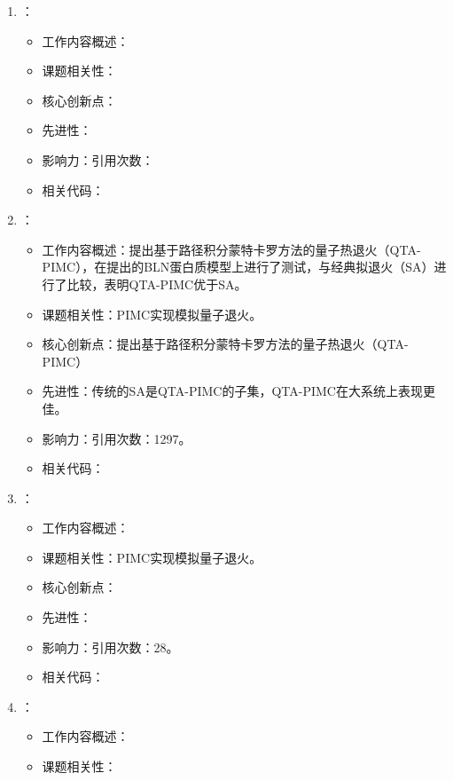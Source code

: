 \begin{enumerate}
\begin{itemize}
            \end{itemize}
            \item \citet{lee2000global}：
            \begin{itemize}
                \item 工作内容概述：
                \item 课题相关性：
                \item 核心创新点：
                \item 先进性：
                \item 影响力：引用次数：
                \item 相关代码：
            \end{itemize}
        \item \citet{farhi2000quantum}：
        \begin{itemize}
            \item 工作内容概述：提出基于路径积分蒙特卡罗方法的量子热退火（QTA-PIMC），在\citet{honeycutt1992nature}提出的BLN蛋白质模型上进行了测试，与经典拟退火（SA）进行了比较，表明QTA-PIMC优于SA。
            \item 课题相关性：PIMC实现模拟量子退火。
            \item 核心创新点：提出基于路径积分蒙特卡罗方法的量子热退火（QTA-PIMC）
            \item 先进性：传统的SA是QTA-PIMC的子集，QTA-PIMC在大系统上表现更佳。
            \item 影响力：引用次数：1297。
            \item 相关代码：
        \end{itemize}
        \item \citet{lee2001quantum}：
            \begin{itemize}
                \item 工作内容概述：
                \item 课题相关性：PIMC实现模拟量子退火。
                \item 核心创新点：
                \item 先进性：
                \item 影响力：引用次数：28。
                \item 相关代码：
            \end{itemize}
            \item \citet{brooke2001tunable}：
            \begin{itemize}
                \item 工作内容概述：
                \item 课题相关性：

\end{itemize}
\end{enumerate}
